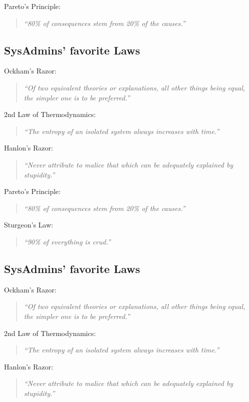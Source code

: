 \documentclass[xga]{xdvislides}
\newcommand{\smallish}{\fontsize{18}{18}\selectfont}
\begin{document}
Pareto's Principle:
\begin{quote}
{\em ``80\% of consequences stem from 20\% of the causes.''}
\end{quote}
\Normalsize

\subsection{SysAdmins' favorite Laws}
\smallish
Ockham's Razor:
\begin{quote}
{\em ``Of two equivalent theories or explanations, all other things being
equal, the simpler one is to be preferred.''}
\end{quote}

2nd Law of Thermodynamics:
\begin{quote}
{\em ``The entropy of an isolated system always increases with time.''}
\end{quote}

Hanlon's Razor:
\begin{quote}
{\em ``Never attribute to malice that which can be adequately explained by
stupidity.''}
\end{quote}

Pareto's Principle:
\begin{quote}
{\em ``80\% of consequences stem from 20\% of the causes.''}
\end{quote}

Sturgeon's Law:
\begin{quote}
{\em ``90\% of everything is crud.''}
\end{quote}
\Normalsize

\subsection{SysAdmins' favorite Laws}
\smallish
Ockham's Razor:
\begin{quote}
{\em ``Of two equivalent theories or explanations, all other things being
equal, the simpler one is to be preferred.''}
\end{quote}

2nd Law of Thermodynamics:
\begin{quote}
{\em ``The entropy of an isolated system always increases with time.''}
\end{quote}

Hanlon's Razor:
\begin{quote}
{\em ``Never attribute to malice that which can be adequately explained by
stupidity.''}
\end{quote}
\end{document}
